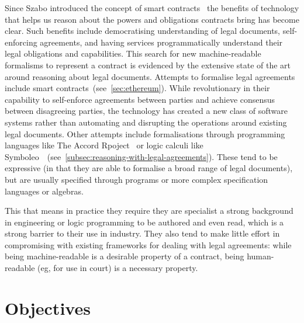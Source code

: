 Since Szabo introduced the concept of smart contracts~\cite{szabo1997smart-contracts} the benefits of technology that helps us reason about the powers and obligations contracts bring has become clear.
Such benefits include democratising understanding of legal documents, self-enforcing agreements, and having services programmatically understand their legal obligations and capabilities.
This search for new machine-readable formalisms to represent a contract is evidenced by the extensive state of the art around reasoning about legal documents.
Attempts to formalise legal agreements include smart contracts~(see~\autoref{sec:ethereum}).
While revolutionary in their capability to self-enforce agreements between parties and achieve consensus between disagreeing parties, the technology has created a new class of software systems rather than automating and disrupting the operations around existing legal documents.
Other attempts include formalisations through programming languages like The Accord Rpoject~\cite{accordHomepage} or logic calculi like Symboleo~\cite{symboleo2020}~(see~\autoref{subsec:reasoning-with-legal-agreements}).
These tend to be expressive (in that they are able to formalise a broad range of legal documents),
but are usually specified through programs or more complex specification languages or algebras.

This that means in practice they require they are specialist a strong background in engineering or logic programming to be authored and even read, which is a strong barrier to their use in industry.
They also tend to make little effort in compromising with existing frameworks for dealing with legal agreements: while being machine-readable is a desirable property of a contract, being human-readable (eg, for use in court) is a necessary property.


\section{Objectives}\label{sec:objectives-and-aims}


